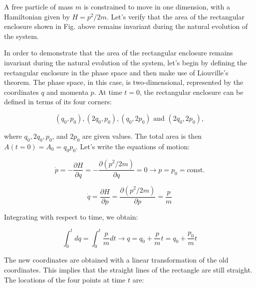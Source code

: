 \documentclass[12pt,a4paper]{report}
\newcommand{\esp}{\vspace{0.5cm}}
\begin{document}
	\esp
	
	A free particle of mass $m$ is constrained to move in one dimension, with a Hamiltonian given by $H = p^2/2m$. Let’s verify that the area of the rectangular enclosure shown in Fig. above remains invariant during the natural evolution of the system.
	
	\esp
	
	In order to demonstrate that the area of the rectangular enclosure remains invariant during the natural evolution of the system, let’s begin by defining the rectangular enclosure in the phase space and then make use of Liouville’s theorem. The phase space, in this case, is two-dimensional, represented by the coordinates $q$ and momenta $p$. At time $t = 0$, the rectangular enclosure can be defined in terms of its four corners:
	
	\esp
	
	\begin{equation*}
		(q_0, p_0), (2q_0, p_0), (q_0, 2p_0) \text{ and } (2q_0, 2p_0),
	\end{equation*}
	
	\esp
	
	where $q_0, 2q_0, p_0$, and $2p_0$ are given values. The total area is then $A(t = 0) = A_0 = q_0 p_0$. Let’s write the equations of motion:
	
	\esp
	
	\begin{equation}
		\dot{p} = -\frac{\partial H}{\partial q} = -\frac{\partial(p^2/2m)}{\partial q} = 0 \longrightarrow p = p_0 = \text{const.}
	\end{equation}
	
	\esp
	
	\begin{equation}
		\dot{q} = \frac{\partial H}{\partial p} = \frac{\partial(p^2/2m)}{\partial p} = \frac{p}{m}
	\end{equation}
	
	\esp
	
	\noindent Integrating with respect to time, we obtain:
	
	\esp
	
	\begin{equation}
		\int_0^t dq = \int_0^t \frac{p}{m} dt \longrightarrow q = q_0 + \frac{p}{m}t = q_0 + \frac{p_0}{m}t
	\end{equation}
	
	\esp
	
	The new coordinates are obtained with a linear transformation of the old coordinates. This implies that the straight lines of the rectangle are still straight. The locations of the four points at time $t$ are:
	
\end{document}
